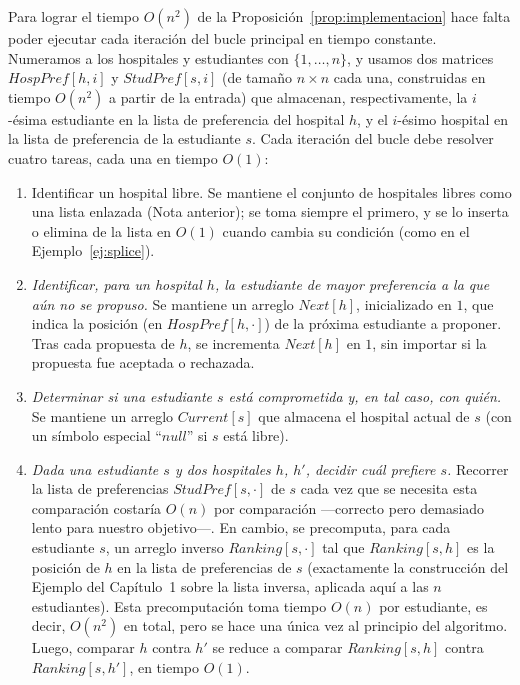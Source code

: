 \documentclass[12pt, spanish, oneside, openany]{book}
\theoremstyle{uprightplain}
\theoremstyle{definition}
\theoremstyle{remark}
\theoremstyle{definition}
\begin{document}
Para lograr el tiempo $O(n^2)$ de la Proposición~\ref{prop:implementacion} hace falta poder ejecutar cada iteración del bucle principal en tiempo constante. Numeramos a los hospitales y estudiantes con $\{1,\dots,n\}$, y usamos dos matrices $\mathit{HospPref}[h,i]$ y $\mathit{StudPref}[s,i]$ (de tamaño $n\times n$ cada una, construidas en tiempo $O(n^2)$ a partir de la entrada) que almacenan, respectivamente, la $i$-ésima estudiante en la lista de preferencia del hospital $h$, y el $i$-ésimo hospital en la lista de preferencia de la estudiante $s$. Cada iteración del bucle debe resolver cuatro tareas, cada una en tiempo $O(1)$:

\begin{enumerate}
    \item Identificar un hospital libre. Se mantiene el conjunto de hospitales libres como una lista enlazada (Nota anterior); se toma siempre el primero, y se lo inserta o elimina de la lista en $O(1)$ cuando cambia su condición (como en el Ejemplo~\ref{ej:splice}).
    \item \emph{Identificar, para un hospital $h$, la estudiante de mayor preferencia a la que aún no se propuso.} Se mantiene un arreglo $\mathit{Next}[h]$, inicializado en $1$, que indica la posición (en $\mathit{HospPref}[h,\cdot]$) de la próxima estudiante a proponer. Tras cada propuesta de $h$, se incrementa $\mathit{Next}[h]$ en $1$, sin importar si la propuesta fue aceptada o rechazada.
    \item \emph{Determinar si una estudiante $s$ está comprometida y, en tal caso, con quién.} Se mantiene un arreglo $\mathit{Current}[s]$ que almacena el hospital actual de $s$ (con un símbolo especial ``$\mathit{null}$'' si $s$ está libre).
    \item \emph{Dada una estudiante $s$ y dos hospitales $h$, $h'$, decidir cuál prefiere $s$.} Recorrer la lista de preferencias $\mathit{StudPref}[s,\cdot]$ de $s$ cada vez que se necesita esta comparación costaría $O(n)$ por comparación —correcto pero demasiado lento para nuestro objetivo—. En cambio, se precomputa, para cada estudiante $s$, un arreglo inverso $\mathit{Ranking}[s,\cdot]$ tal que $\mathit{Ranking}[s,h]$ es la posición de $h$ en la lista de preferencias de $s$ (exactamente la construcción del Ejemplo del Capítulo~1 sobre la lista inversa, aplicada aquí a las $n$ estudiantes). Esta precomputación toma tiempo $O(n)$ por estudiante, es decir, $O(n^2)$ en total, pero se hace una única vez al principio del algoritmo. Luego, comparar $h$ contra $h'$ se reduce a comparar $\mathit{Ranking}[s,h]$ contra $\mathit{Ranking}[s,h']$, en tiempo $O(1)$.
\end{enumerate}
\end{document}
